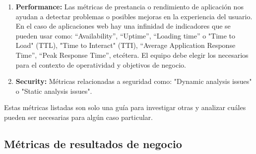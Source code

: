 \begin{enumerate}
{  \begin{enumerate}    
    \item {\textbf{Escaped defects:}
Un defecto escapado es un defecto que no fue encontrado por el equipo en el proceso de desarrollo y que escapó al control de calidad interno del equipo. Por lo general, esos problemas son incidentes en operaciones (OPCON), es decir que los encuentran los usuarios finales una vez que la versión de release fue publicada y puesta a su disposición. Su cálculo más simple es cantidad en un período dado (por ejemplo cantidad de OPCON por sprint). Como mencionamos antes, es una medida de fiabilidad, cuanto menos defectos más fiable.
}
\item {\textbf{Change Failure Rate:} El porcentaje de cambios a producción (releases o cambios) que dan como resultado un servicio degradado o fallo y posteriormente requieren remediación (hotfix, rollback, fix-forward, patch, etc.). Esta métrica también puede usarse como prestancia o calidad del proceso de desarrollo \footnote{\cite{Humble-2018}}.
}
  \end{enumerate}
  }


  \item {\textbf{Performance:}
Las métricas de prestancia o rendimiento de aplicación nos ayudan a detectar problemas o posibles mejoras en la experiencia del usuario. En el caso de aplicaciones web hay una infinidad de indicadores que se pueden usar como: “Availability”, “Uptime”, “Loading time” o "Time to Load" (TTL), "Time to Interact" (TTI), “Average Application Response Time”, “Peak Response Time”, etcétera. El equipo debe elegir los necesarios para el contexto de operatividad y objetivos de negocio.
}

  \item {\textbf{Security:}
  Métricas relacionadas a seguridad como: "Dynamic analysis issues" o "Static analysis issues".
}

  \end{enumerate}

Estas métricas listadas son solo una guía para investigar otras y analizar cuáles pueden ser necesarias para algún caso particular.

\subsection{Métricas de resultados de negocio}

